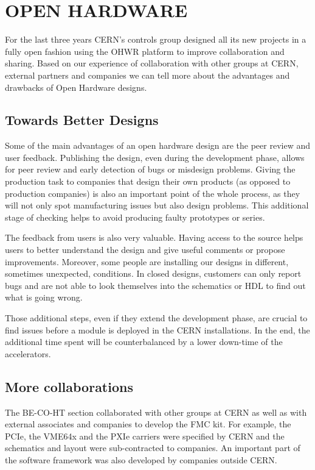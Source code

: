 \documentclass{JAC2003}
\begin{document}
\section{OPEN HARDWARE}
For the last three years CERN's controls group designed all its new projects in a fully open fashion using the OHWR platform to improve collaboration and sharing.
Based on our experience of collaboration with other groups at CERN, external partners and companies we can tell more about the advantages and drawbacks of Open Hardware designs.

\subsection{Towards Better Designs}
Some of the main advantages of an open hardware design are the peer review and user feedback.
Publishing the design, even during the development phase, allows for peer review and early detection of bugs or misdesign problems.
Giving the production task to companies that design their own products (as opposed to production companies) is also an important point of the whole process, as they will not only spot manufacturing issues but also design problems.
This additional stage of checking helps to avoid producing faulty prototypes or series.

The feedback from users is also very valuable.
Having access to the source helps users to better understand the design and give useful comments or propose improvements.
Moreover, some people are installing our designs in different, sometimes unexpected, conditions.
In closed designs, customers can only report bugs and are not able to look themselves into the schematics or HDL to find out what is going wrong.

Those additional steps, even if they extend the development phase, are crucial to find issues before a module is deployed in the CERN installations.
In the end, the additional time spent will be counterbalanced by a lower down-time of the accelerators.

\subsection{More collaborations}
The BE-CO-HT section collaborated with other groups at CERN as well as with external associates and companies to develop the FMC kit.
For example, the PCIe, the VME64x and the PXIe carriers were specified by CERN and the schematics and layout were sub-contracted to companies.
An important part of the software framework was also developed by companies outside CERN.
\end{document}

